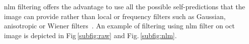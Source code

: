 \ac{nlm} filtering offers the advantage to use all the possible self-predictions that the image can provide rather than local or frequency filters such as Gaussian, anisotropic or Wiener filters~\cite{buades2005non}.
An example of filtering using \ac{nlm} filter on \ac{oct} image is depicted in Fig\,\ref{subfig:raw} and Fig.\,\ref{subfig:nlm}.


